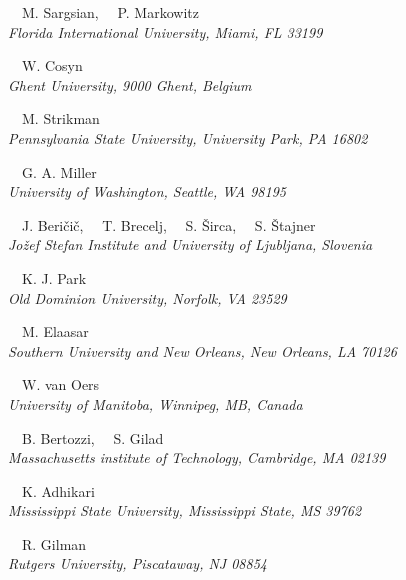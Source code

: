 \begin{center}
\vspace{10px}

{~~M. Sargsian,
~~P. Markowitz}\\
\ls
{\normalsize\it{Florida International University, Miami, FL 33199}}

\vspace{10px}

{~~W. Cosyn}\\
\ls
{\normalsize\it{Ghent University, 9000 Ghent, Belgium}}

\vspace{10px}

{~~M. Strikman}\\
\ls
{\normalsize\it{Pennsylvania State University, University Park, PA 16802}}

\vspace{10px}

{~~G. A. Miller}\\
\ls
{\normalsize\it{University of Washington, Seattle, WA 98195}}

\vspace{10px}

{~~J. Beri\v{c}i\v{c}, 
~~T. Brecelj, 
~~S. \v{S}irca, 
~~S. \v{S}tajner} \\
\ls
{\normalsize\it{Jo\v{z}ef Stefan Institute and University of Ljubljana, Slovenia}}

\vspace{10px}

{~~K. J. Park}\\
\ls
{\normalsize\it{Old Dominion University, Norfolk, VA 23529}}

\vspace{10px}

{~~M. Elaasar}\\
\ls
{\normalsize\it{Southern University and New Orleans, New Orleans, LA 70126}}

\vspace{10px}

{~~W. van Oers}\\
\ls
{\normalsize\it{University of Manitoba, Winnipeg, MB, Canada}}

\vspace{10px}

{~~B. Bertozzi,
~~S. Gilad}\\
\ls
{\normalsize\it{Massachusetts institute of Technology, Cambridge, MA 02139}}

\vspace{10px}

{~~K. Adhikari}\\
\ls
{\normalsize\it{Mississippi State University, Mississippi State, MS 39762}}

\vspace{10px}

{~~R. Gilman}\\
\ls
{\normalsize\it{Rutgers University, Piscataway, NJ 08854}}
\ks

%



\end{center}


\setcounter{footnote}{0}
